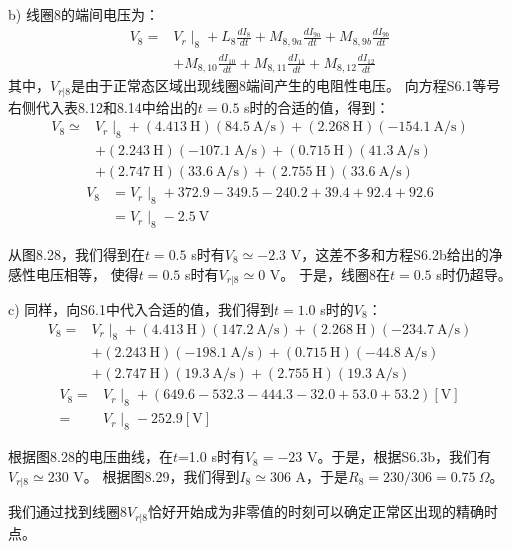 b) 线圈8的端间电压为：
\begin{align*}%
V_8=&V_r\mid_8+L_8\frac{dI_8}{dt}+M_{8,9a}\frac{dI_{9a}}{dt}+M_{8,9b}\frac{dI_{9b}}{dt} \\
&+M_{8,10}\frac{dI_{10}}{dt}+M_{8,11}\frac{dI_{11}}{dt}+M_{8,12}\frac{dI_{12}}{dt}
\end{align*}
其中，$V_{r|8}$是由于正常态区域出现线圈8端间产生的电阻性电压。
向方程S6.1等号右侧代入表8.12和8.14中给出的$t=0.5$ s时的合适的值，得到：
\begin{align*}%
V_8\simeq& V_r\mid_8+(4.413\ \mathrm{H})(84.5\ \mathrm{A/s})+(2.268\ \mathrm{H})(-154.1\ \mathrm{A/s}) \\
&+(2.243\ \mathrm{H})(-107.1\ \mathrm{A/s})+(0.715\ \mathrm{H})(41.3\ \mathrm{A/s}) \\
&+(2.747\ \mathrm{H})(33.6\ \mathrm{A/s})+(2.755\ \mathrm{H})(33.6\ \mathrm{A/s}) \tag{S6.2a}
\end{align*}
\begin{align*}%
V_8&=V_r\mid_8+372.9-349.5-240.2+39.4+92.4+92.6 \\
&=V_r\mid_8-2.5\ \mathrm{V} \tag{S6.2b}
\end{align*}

从图8.28，我们得到在$t=0.5$ s时有$V_8\simeq -2.3$ V，这差不多和方程S6.2b给出的净感性电压相等，
使得$t=0.5$ s时有$V_{r|8}\simeq 0$ V。
于是，线圈8在$t=0.5$ s时仍超导。

c) 同样，向S6.1中代入合适的值，我们得到$t=1.0$ s时的$V_8$：
\begin{align*}%
V_8=&V_r\mid_8+(4.413\ \mathrm{H})(147.2\ \mathrm{A/s})+(2.268\ \mathrm{H})(-234.7\ \mathrm{A/s}) \\
&+(2.243\ \mathrm{H})(-198.1\ \mathrm{A/s})+(0.715\ \mathrm{H})(-44.8\ \mathrm{A/s}) \\
&+(2.747\ \mathrm{H})(19.3\ \mathrm{A/s})+(2.755\ \mathrm{H})(19.3\ \mathrm{A/s})
\end{align*}
\begin{align*}%
V_8=&V_r\mid_8+(649.6-532.3-444.3-32.0+53.0+53.2)[\mathrm{V}]\\
=&V_r\mid_8-252.9[\mathrm{V}]
\end{align*}

根据图8.28的电压曲线，在$t$=1.0 s时有$V_8=-23$ V。于是，根据S6.3b，我们有$V_{r|8}\simeq 230$ V。
根据图8.29，我们得到$I_8\simeq$306 A，于是$R_8=230/306=0.75\ \Omega$。

我们通过找到线圈8$V_{r|8}$恰好开始成为非零值的时刻可以确定正常区出现的精确时点。

